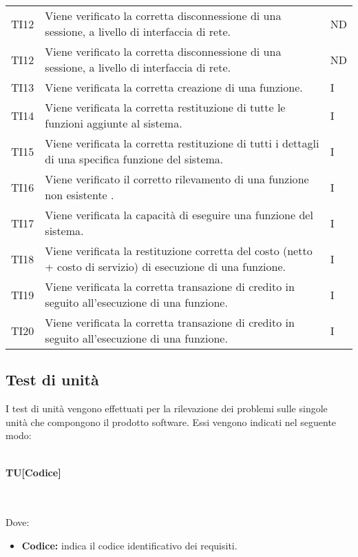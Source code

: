 \begin{longtable}{|C{1.5cm}|C{10cm}|C{1.5cm}|}
	TI12 &
	Viene verificato la corretta disconnessione di una sessione, a livello di interfaccia di rete.  &
	ND \\

	TI12 &
	Viene verificato la corretta disconnessione di una sessione, a livello di interfaccia di rete.  &
	ND \\

	TI13 &
	Viene verificata la corretta creazione di una funzione.  &
	I \\

	TI14 &
	Viene verificata la corretta restituzione di tutte le funzioni aggiunte al sistema.  &
	I \\

	TI15 &
	Viene verificata la corretta restituzione di tutti i dettagli di una specifica funzione del sistema.  &
	I \\

	TI16 &
	Viene verificato il corretto rilevamento di una funzione non esistente .  &
	I \\

	TI17 &
	Viene verificata la capacità di eseguire una funzione del sistema.  &
	I \\

	TI18 &
	Viene verificata la restituzione corretta del costo (netto + costo di servizio) di esecuzione di una funzione.  &
	I \\

	TI19 &
	Viene verificata la corretta transazione di credito in seguito all'esecuzione di una funzione.  &
	I \\

	TI20 &
	Viene verificata la corretta transazione di credito in seguito all'esecuzione di una funzione.  &
	I \\
\end{longtable}

\newpage
\subsection{Test di unità}
I test di unità vengono effettuati per la rilevazione dei problemi sulle singole unità che compongono il prodotto software. Essi vengono indicati nel seguente modo:\\\\
\centerline{\textbf{TU[Codice]}}\\\\
Dove:
\begin{itemize}
	\item \textbf{Codice:} indica il codice identificativo dei requisiti.
\end{itemize}


